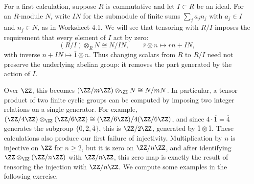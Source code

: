 \documentclass[12pt,reqno]{amsart}
\begin{document}
\hrulefill

For a first calculation, suppose $R$ is commutative and let $I\subset R$ be an ideal. For an $R$-module $N$, write $IN$ for the submodule of finite sums $\sum_ja_jn_j$ with $a_j\in I$ and $n_j\in N$, as in Worksheet 4.1. We will see that tensoring with $R/I$ imposes the requirement that every element of $I$ act by zero:
\[
(R/I)\otimes_RN\cong N/IN,\qquad\overline r\otimes n\longmapsto rn+IN,
\]
with inverse $n+IN\mapsto\overline1\otimes n$. Thus changing scalars from $R$ to $R/I$ need not preserve the underlying abelian group: it removes the part generated by the action of $I$.

Over $\ZZ$, this becomes $(\ZZ/m\ZZ)\otimes_{\ZZ}N\cong N/mN$. In particular, a tensor product of two finite cyclic groups can be computed by imposing two integer relations on a single generator. For example, $(\ZZ/4\ZZ)\otimes_{\ZZ}(\ZZ/6\ZZ)\cong(\ZZ/6\ZZ)/4(\ZZ/6\ZZ)$, and since $4\cdot\overline1=\overline4$ generates the subgroup $\{\overline0,\overline2,\overline4\}$, this is $\ZZ/2\ZZ$, generated by $\overline1\otimes\overline1$. These calculations also produce our first failure of injectivity. Multiplication by $n$ is injective on $\ZZ$ for $n\geq2$, but it is zero on $\ZZ/n\ZZ$, and after identifying $\ZZ\otimes_{\ZZ}(\ZZ/n\ZZ)$ with $\ZZ/n\ZZ$, this zero map is exactly the result of tensoring the injection with $\ZZ/n\ZZ$. We compute some examples in the following exercise.

\hrulefill
\end{document}
